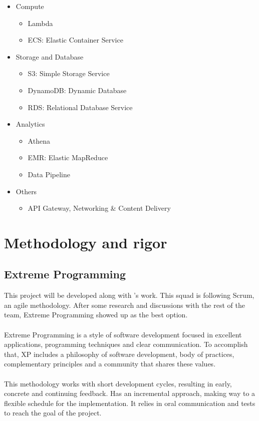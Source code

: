 \begin{itemize}
    \item Compute
    \begin{itemize}
        \item Lambda
        \item ECS: Elastic Container Service
    \end{itemize}
    \item Storage and Database
    \begin{itemize}
        \item S3: Simple Storage Service
        \item DynamoDB: Dynamic Database
        \item RDS: Relational Database Service
    \end{itemize}
    \item Analytics
    \begin{itemize}
        \item Athena
        \item EMR: Elastic MapReduce
        \item Data Pipeline
    \end{itemize}
    \item Others
    \begin{itemize}
        \item API Gateway, Networking \& Content Delivery
    \end{itemize}
\end{itemize}


\section{Methodology and rigor} \label{methodology_rigor}

\subsection{Extreme Programming} \label{xp}

This project will be developed along with \squad's work. This squad is following Scrum, an agile methodology. After some research and discussions with the rest of the team, Extreme Programming\cite{xp} showed up as the best option.
\\\\
Extreme Programming is a style of software development focused in excellent applications, programming techniques and clear communication. To accomplish that, XP includes a philosophy of software development, body of practices, complementary principles and a community that shares these values.
\\\\
This methodology works with short development cycles, resulting in early, concrete and continuing feedback. Has an incremental approach, making way to a flexible schedule for the implementation. It relies in oral communication and tests to reach the goal of the project.

